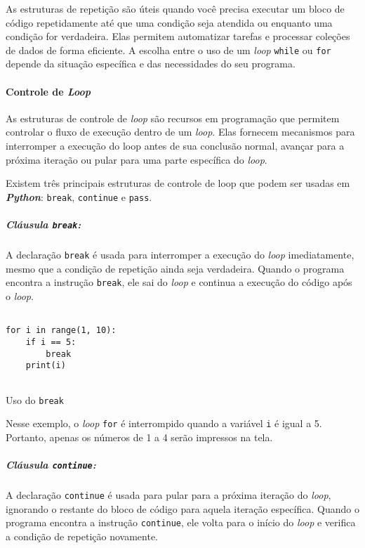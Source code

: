 \documentclass[a4paper, 12pt, onecolumn,singlespacing]{article}
\begin{document}
As estruturas de repetição são úteis quando você precisa executar um bloco de código repetidamente até que uma condição seja atendida ou enquanto uma condição for verdadeira. Elas permitem automatizar tarefas e processar coleções de dados de forma eficiente. A escolha entre o uso de um \textit{loop} \texttt{while} ou \texttt{for} depende da situação específica e das necessidades do seu programa.

	\paragraph{Controle de \textit{Loop}} As estruturas de controle de \textit{loop} são recursos em programação que permitem controlar o fluxo de execução dentro de um \textit{loop}. Elas fornecem mecanismos para interromper a execução do loop antes de sua conclusão normal, avançar para a próxima iteração ou pular para uma parte específica do \textit{loop}.
	
	Existem três principais estruturas de controle de loop que podem ser usadas em \textbf{\textit{Python}}: \texttt{break}, \texttt{continue} e \texttt{pass}.
	
	\subparagraph{Cláusula \texttt{break}:} A declaração \texttt{break} é usada para interromper a execução do \textit{loop} imediatamente, mesmo que a condição de repetição ainda seja verdadeira. Quando o programa encontra a instrução \texttt{break}, ele sai do \textit{loop} e continua a execução do código após o \textit{loop}.
	
\begin{listing}[!ht]
	\begin{verbatim}
		
for i in range(1, 10):
	if i == 5:
		break
	print(i)
		
	\end{verbatim}
	\label{clausula_break}
	\caption{Uso do \texttt{break}}
\end{listing}
	
	Nesse exemplo, o \textit{loop} \texttt{for} é interrompido quando a variável \texttt{i} é igual a 5. Portanto, apenas os números de 1 a 4 serão impressos na tela.
	
	\subparagraph{Cláusula \texttt{continue}:}A declaração \texttt{continue} é usada para pular para a próxima iteração do \textit{loop}, ignorando o restante do bloco de código para aquela iteração específica. Quando o programa encontra a instrução \texttt{continue}, ele volta para o início do \textit{loop} e verifica a condição de repetição novamente.
	\pagebreak
	
\end{document}
